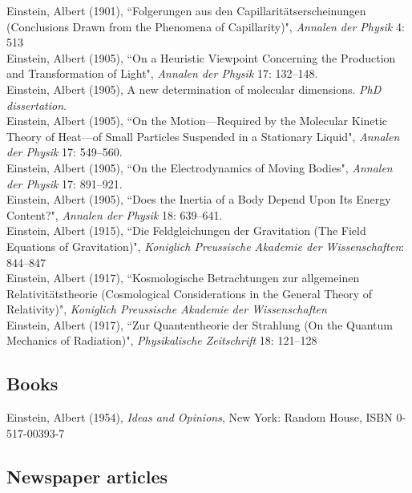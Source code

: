 \documentclass[11pt]{article} %
\begin{document}
Einstein, Albert (1901), “Folgerungen aus den Capillaritätserscheinungen (Conclusions Drawn from the Phenomena of Capillarity)", \emph{Annalen der Physik} 4: 513\\
Einstein, Albert (1905), “On a Heuristic Viewpoint Concerning the Production and Transformation of Light", \emph{Annalen der Physik} 17: 132–148.\\
Einstein, Albert (1905), A new determination of molecular dimensions. \emph{PhD dissertation}.\\
Einstein, Albert (1905), “On the Motion—Required by the Molecular Kinetic Theory of Heat—of Small Particles Suspended in a Stationary Liquid", \emph{Annalen der Physik} 17: 549–560.\\
Einstein, Albert (1905), “On the Electrodynamics of Moving Bodies", \emph{Annalen der Physik} 17: 891–921.\\
Einstein, Albert (1905), “Does the Inertia of a Body Depend Upon Its Energy Content?", \emph{Annalen der Physik} 18: 639–641.\\
Einstein, Albert (1915), “Die Feldgleichungen der Gravitation (The Field Equations of Gravitation)", \emph{Koniglich Preussische Akademie der Wissenschaften}: 844–847\\
Einstein, Albert (1917), “Kosmologische Betrachtungen zur allgemeinen Relativitätstheorie (Cosmological Considerations in the General Theory of Relativity)", \emph{Koniglich Preussische Akademie der Wissenschaften}\\
Einstein, Albert (1917), “Zur Quantentheorie der Strahlung (On the Quantum Mechanics of Radiation)", \emph{Physikalische Zeitschrift} 18: 121–128


\subsection*{Books}

Einstein, Albert (1954), \emph{Ideas and Opinions}, New York: Random House, ISBN 0-517-00393-7


\subsection*{Newspaper articles}
\end{document}
